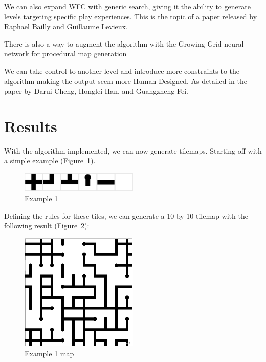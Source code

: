 \documentclass[10pt,oneside,a4paper]{article}
\begin{document}
We can also expand WFC with generic search, giving it the ability to generate levels targeting specific play experiences.
This is the topic of a paper released by Raphael Bailly and Guillaume Levieux\cite{BL22}.

There is also a way to augment the algorithm with the Growing Grid neural network for procedural map generation~\cite{NMBP20}

We can take control to another level and introduce more constraints to the algorithm making the output seem more Human-Designed.
As detailed in the paper by Darui Cheng, Honglei Han, and Guangzheng Fei\cite{CHF20}.

\section{Results}\label{sec:results}
With the algorithm implemented, we can now generate tilemaps.
Starting off with a simple example (Figure~\ref{fig:example1}).
\begin{figure}[h]
    \centering
    \includegraphics[width=0.5\textwidth]{figures/road_tiles.png}
    \caption{Example 1}\label{fig:example1}
\end{figure}

Defining the rules for these tiles, we can generate a 10 by 10 tilemap with the following result (Figure~\ref{fig:example1map}):

\begin{figure}[h]
    \centering
    \includegraphics[width=0.5\textwidth]{figures/roads_output.png}
    \caption{Example 1 map}\label{fig:example1map}
\end{figure}
\end{document}
